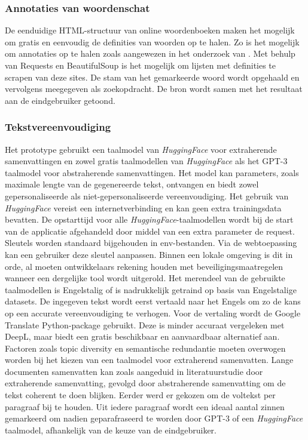 \subsubsection{Annotaties van woordenschat}

De eenduidige HTML-structuur van online woordenboeken maken het mogelijk om gratis en eenvoudig de definities van woorden op te halen. Zo is het mogelijk om annotaties op te halen zoals aangewezen in het onderzoek van \textcite{Bulte2018}. Met behulp van Requests en BeautifulSoup is het mogelijk om lijsten met definities te scrapen van deze sites. De stam van het gemarkeerde woord wordt opgehaald en vervolgens meegegeven als zoekopdracht. De bron wordt samen met het resultaat aan de eindgebruiker getoond. 

\subsubsection{Tekstvereenvoudiging}

Het prototype gebruikt een taalmodel van \textit{HuggingFace} voor extraherende samenvattingen en zowel gratis taalmodellen van \textit{HuggingFace} als het GPT-3 taalmodel voor abstraherende samenvattingen. Het model kan parameters, zoals maximale lengte van de gegenereerde tekst, ontvangen en biedt zowel gepersonaliseerde als niet-gepersonaliseerde vereenvoudiging. Het gebruik van \textit{HuggingFace} vereist een internetverbinding en kan geen extra trainingsdata bevatten. De opstarttijd voor alle \textit{HuggingFace}-taalmodellen wordt bij de start van de applicatie afgehandeld door middel van een extra parameter de request. Sleutels worden standaard bijgehouden in env-bestanden. Via de webtoepassing kan een gebruiker deze sleutel aanpassen. Binnen een lokale omgeving is dit in orde, al moeten ontwikkelaars rekening houden met beveiligingsmaatregelen wanneer een dergelijke tool wordt uitgerold. Het merendeel van de gebruikte taalmodellen is Engelstalig of is nadrukkelijk getraind op basis van Engelstalige datasets. De ingegeven tekst wordt eerst vertaald naar het Engels om zo de kans op een accurate vereenvoudiging te verhogen. Voor de vertaling wordt de Google Translate Python-package gebruikt. Deze is minder accuraat vergeleken met DeepL, maar biedt een gratis beschikbaar en aanvaardbaar alternatief aan. Factoren zoals topic diversity en semantische redundantie moeten overwogen worden bij het kiezen van een taalmodel voor extraherend samenvatten. Lange documenten samenvatten kan zoals aangeduid in literatuurstudie door extraherende samenvatting, gevolgd door abstraherende samenvatting om de tekst coherent te doen blijken. Eerder werd er gekozen om de voltekst per paragraaf bij te houden. Uit iedere paragraaf wordt een ideaal aantal zinnen gemarkeerd om nadien geparafraseerd te worden door GPT-3 of een \textit{HuggingFace} taalmodel, afhankelijk van de keuze van de eindgebruiker.


